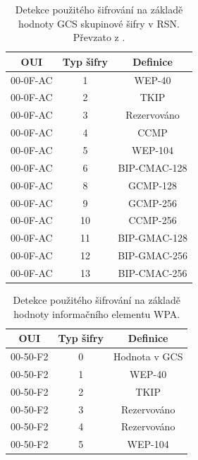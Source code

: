 \begin{table}[htb]
\centering
\begin{tabular}{|c|c|c|}
\hline
\textbf{OUI} & \textbf{Typ šifry} & \textbf{Definice} \\ \hline
00-0F-AC     & 1                  & WEP-40            \\ \hline
00-0F-AC     & 2                  & TKIP              \\ \hline
00-0F-AC     & 3                  & Rezervováno       \\ \hline
00-0F-AC     & 4                  & CCMP              \\ \hline
00-0F-AC     & 5                  & WEP-104           \\ \hline
00-0F-AC     & 6                  & BIP-CMAC-128           \\ \hline
00-0F-AC     & 8                  & GCMP-128           \\ \hline
00-0F-AC     & 9                  & GCMP-256           \\ \hline
00-0F-AC     & 10                  & CCMP-256           \\ \hline
00-0F-AC     & 11                  & BIP-GMAC-128           \\ \hline
00-0F-AC     & 12                  & BIP-GMAC-256           \\ \hline
00-0F-AC     & 13                  & BIP-CMAC-256           \\ \hline
\end{tabular}
\caption{Detekce použitého šifrování na základě hodnoty GCS skupinové šifry v RSN. Převzato z \cite{gast2017802}.}
\label{table:gcs}
\end{table}

\begin{table}[htb]
\centering
\begin{tabular}{|c|c|c|}
\hline
\textbf{OUI} & \textbf{Typ šifry} & \textbf{Definice} \\ \hline
00-50-F2     & 0                  & Hodnota v GCS           \\ \hline
00-50-F2     & 1                  & WEP-40              \\ \hline
00-50-F2     & 2                  & TKIP       \\ \hline
00-50-F2     & 3                  & Rezervováno              \\ \hline
00-50-F2     & 4                  & Rezervováno           \\ \hline
00-50-F2     & 5                  & WEP-104           \\ \hline
\end{tabular}
\caption{Detekce použitého šifrování na základě hodnoty informačního elementu WPA.}
\label{table:wpa-oui}
\end{table}


